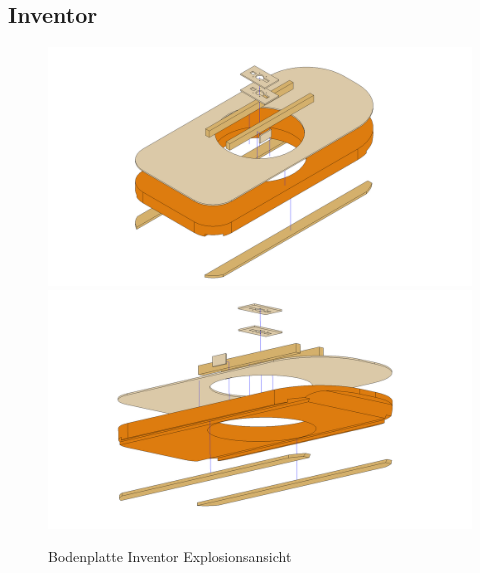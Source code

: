 \subsection{Inventor}
\begin{figure}[H]
    \centering
    \includegraphics[width=\textwidth]{../../../../Inventor/Bodenplatte/png/Bodenplatte_Praesentation_Hauptansicht.png}
    \includegraphics[width=\textwidth]{../../../../Inventor/Bodenplatte/png/Bodenplatte_Praesentation_SeitlichUnten.png}
    \label{fig:konst:bodenplatte:inventor}
    \caption{Bodenplatte Inventor Explosionsansicht}
\end{figure}
\clearpage

